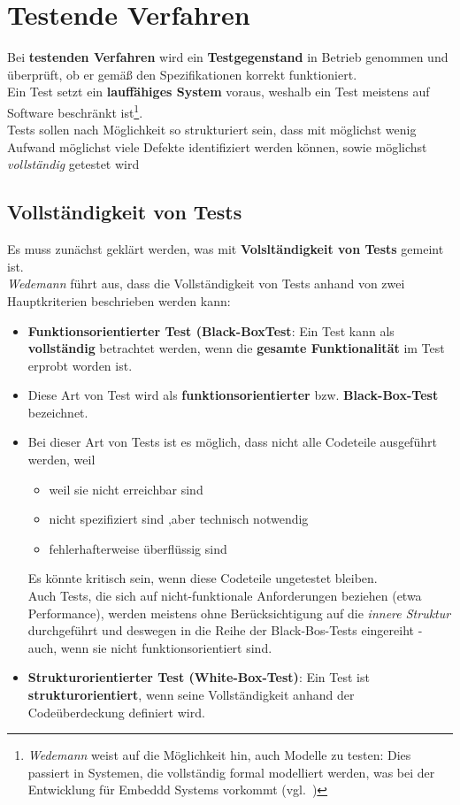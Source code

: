 \section{Testende Verfahren}
Bei \textbf{testenden Verfahren} wird ein \textbf{Testgegenstand} in Betrieb genommen und überprüft, ob er gemäß den Spezifikationen korrekt funktioniert.\\

\noindent
Ein Test setzt ein \textbf{lauffähiges System} voraus, weshalb ein Test meistens auf Software beschränkt ist\footnote{
\textit{Wedemann} weist auf die Möglichkeit hin, auch Modelle zu testen: Dies passiert in Systemen, die vollständig formal modelliert werden, was bei der Entwicklung für Embeddd Systems vorkommt (vgl.~\cite[41]{Wed09c})
}.\\

\noindent
Tests sollen nach Möglichkeit so strukturiert sein, dass mit möglichst wenig Aufwand möglichst viele Defekte identifiziert werden können, sowie möglichst \textit{vollständig} getestet wird

\subsection*{Vollständigkeit von Tests}
Es muss zunächst geklärt werden, was mit \textbf{Volsltändigkeit von Tests} gemeint ist.\\
\textit{Wedemann} führt aus, dass die Vollständigkeit von Tests anhand von zwei Hauptkriterien beschrieben werden kann:

\begin{itemize}
    \item \textbf{Funktionsorientierter Test (Black-BoxTest}: Ein Test kann als \textbf{vollständig} betrachtet werden, wenn die \textbf{gesamte Funktionalität} im Test erprobt worden ist.
    \item[] Diese Art von Test wird als \textbf{funktionsorientierter} bzw. \textbf{Black-Box-Test} bezeichnet.
    \item[] Bei dieser Art von Tests ist es möglich, dass nicht alle Codeteile ausgeführt werden, weil
    \begin{itemize}
        \item weil sie nicht erreichbar sind
        \item nicht spezifiziert sind ,aber technisch notwendig
        \item fehlerhafterweise überflüssig sind
    \end{itemize}
    \noindent
    Es könnte kritisch sein, wenn diese Codeteile ungetestet bleiben.\\
    Auch Tests, die sich auf nicht-funktionale Anforderungen beziehen (etwa Performance), werden meistens ohne Berücksichtigung auf die \textit{innere Struktur} durchgeführt und deswegen in die Reihe der Black-Bos-Tests eingereiht - auch, wenn sie nicht funktionsorientiert sind.
    \item \textbf{Strukturorientierter Test (White-Box-Test)}: Ein Test ist \textbf{strukturorientiert}, wenn seine Vollständigkeit anhand der Codeüberdeckung definiert wird.
\end{itemize}

